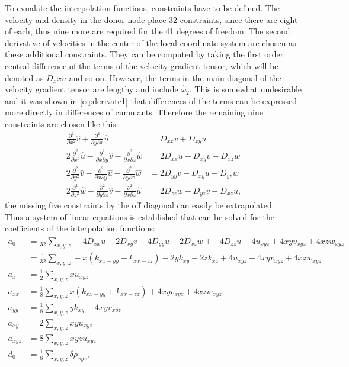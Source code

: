 To evualate the interpolation functions, constraints have to be defined. The velocity and density in the donor node place 32 constraints, since there are eight of each, thus nine more are required for the 41 degrees of freedom. The second derivative of velocities in the center of the local coordinate system are chosen as these additional constraints. They can be computed by taking the first order central difference of the terms of the velocity gradient tensor, which will be denoted as $D_xx u$ and so on. However, the terms in the main diagonal of the velocity gradient tensor are lengthy and include $\hat{\omega}_2$. This is somewhat undesirable and it was shown in \eqref{eq:derivate1} that differences of the terms can be expressed more directly in differences of cumulants. Therefore the remaining nine constraints are chosen like this:
\begin{align}
\frac{\partial^2}{\partial x^2} \hat{v}+\frac{\partial^2}{\partial y \partial x} \hat{u} &= D_{xx} v + D_{xy} u \label{eq:const1} \\
2\frac{\partial^2}{\partial x^2} \hat{u} - \frac{\partial^2}{\partial x \partial y} \hat{v} - \frac{\partial^2}{\partial x \partial z} \hat{w} &= 2 D_{xx}u- D_{xy}v - D_{xz}w \\
2\frac{\partial^2}{\partial y^2} \hat{v} - \frac{\partial^2}{\partial x \partial y} \hat{u} - \frac{\partial^2}{\partial y \partial z} \hat{w} &= 2 D_{yy}v- D_{xy}u - D_{yz}w \\
2\frac{\partial^2}{\partial z^2} \hat{w} - \frac{\partial^2}{\partial y \partial z} \hat{v} - \frac{\partial^2}{\partial x \partial z} \hat{u} &= 2 D_{zz}w- D_{yz}v - D_{xz}u, \label{eq:const2}
\end{align}
the missing five constraints by the off diagonal can easily be extrapolated. \\
Thus a system of linear equations is established that can be solved for the coefficients of the interpolation functions:
\begin{align}
a_0 &= \frac{1}{32} \sum_{x,y,z}  -4 D_{xx}u-2 D_{xy}v -4D_{yy}u- 2 D_{xz}w + -4 D_{zz}u + 4 u_{xyz} + 4xyv_{xyz} + 4 xzw_{xyz} \\
&= \frac{1}{32} \sum_{x,y,z}  -x\left(k_{xx-yy} + k_{xx-zz}\right) - 2yk_{xy} -2zk_{xz} + 4 u_{xyz} + 4xyv_{xyz} + 4 xzw_{xyz} \\
a_x &= \frac{1}{2} \sum_{x,y,z} x u_{xyz} \\
a_{xx} &= \frac{1}{8} \sum_{x,y,z}x\left(k_{xx-yy}+k_{xx-zz}\right) + 4xyv_{xyz}+ 4 xzw_{xyz} \\
a_{yy} &= \frac{1}{8} \sum_{x,y,z}y k_{xy} - 4 xy v_{xyz} \\
a_{xy} &= 2 \sum_{x,y,z} xyu_{xyz} \\
a_{xyz} &= 8 \sum_{x,y,z} xyzu_{xyz} \\
d_0 &= \frac{1}{8} \sum_{x,y,z} \delta \rho_{xyz}, 
\end{align}

